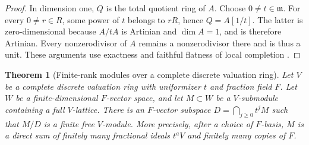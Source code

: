 \documentclass[11pt,a4paper]{article}
\newtheorem{theorem}{Theorem}[section]
\theoremstyle{definition}
\begin{document}
\begin{proof}
In dimension one, $Q$ is the total quotient ring of $A$. Choose
$0\ne t\in\mathfrak m$. For every $0\ne r\in R$, some power of $t$
belongs to $rR$, hence $Q=A[1/t]$. The latter is zero-dimensional
because $A/tA$ is Artinian and $\dim A=1$, and is therefore Artinian.
Every nonzerodivisor of $A$ remains a nonzerodivisor there and is thus
a unit. These arguments use exactness and faithful flatness of local
completion \cite[Lemmas 10.97.2--3, tags 00MB and 00MC]{StacksCompletionAnalytic}.

\end{proof}

\begin{theorem}[Finite-rank modules over a complete discrete valuation ring]\label{result-32}
Let $V$ be a complete discrete valuation ring with
uniformizer $t$ and fraction field $F$. Let $W$ be a
finite-dimensional $F$-vector space, and let $M\subset W$
be a $V$-submodule containing a full $V$-lattice.
There is an $F$-vector subspace
$D=\bigcap_{j\ge0}t^jM$ such that $M/D$ is a finite
free $V$-module. More precisely, after a choice of
$F$-basis, $M$ is a direct sum of finitely many
fractional ideals $t^aV$ and finitely many copies of $F$.
\end{theorem}
\end{document}
